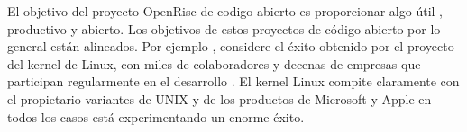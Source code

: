 \documentclass[a4paper,11pt]{article}
\begin{document}
El objetivo del proyecto OpenRisc de codigo abierto es proporcionar algo útil , productivo y abierto.
Los objetivos de estos proyectos de código abierto por lo general están alineados. 
Por ejemplo , considere el éxito obtenido por el proyecto del kernel de Linux, con miles de colaboradores y decenas de empresas que participan regularmente
en el desarrollo . El kernel Linux compite claramente con el propietario variantes de UNIX y de los productos de Microsoft y Apple  en todos los casos está experimentando un enorme éxito.
\end{document}
